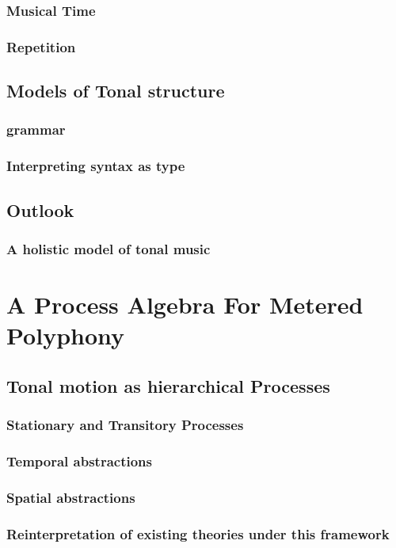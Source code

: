     \section{Musical Time}
    \section{Repetition}
\chapter{Models of Tonal structure}
    \section{grammar}
    \section{Interpreting syntax as type}
\chapter{Outlook}
    \section{A holistic model of tonal music}
%
\cleardoublepage
\part{A Process Algebra For Metered Polyphony}
\chapter{Tonal motion as hierarchical Processes}
    \section{Stationary and Transitory Processes}
    \section{Temporal abstractions}
    \section{Spatial abstractions}
    \section{Reinterpretation of existing theories under this framework}

